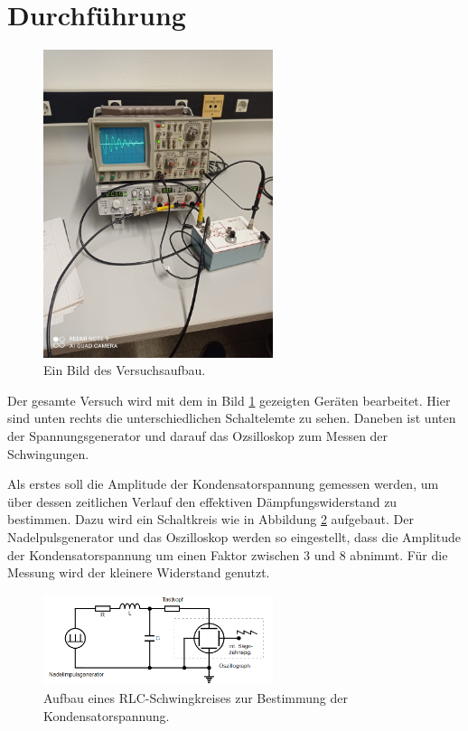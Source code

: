 \section{Durchführung}

\begin{figure}[H]
    \centering
    \includegraphics[width=0.6\textwidth]{images/Aufbau.jpeg}
    \caption{Ein Bild des Versuchsaufbau.}
    \label{img:aufb}
\end{figure}

\noindent Der gesamte Versuch wird mit dem in Bild \ref{img:aufb} gezeigten Geräten bearbeitet. Hier sind unten rechts die unterschiedlichen 
Schaltelemte zu sehen. Daneben ist unten der Spannungsgenerator und darauf das Ozsilloskop zum Messen der Schwingungen.

\noindent Als erstes soll die Amplitude der Kondensatorspannung gemessen werden, um über dessen zeitlichen Verlauf den effektiven Dämpfungswiderstand 
zu bestimmen. Dazu wird ein Schaltkreis wie in Abbildung \ref{img:5a} aufgebaut. Der Nadelpulsgenerator und das Oszilloskop werden so eingestellt, dass die 
Amplitude der Kondensatorspannung um einen Faktor zwischen 3 und 8 abnimmt. Für die Messung wird der kleinere Widerstand genutzt.

\begin{figure}[H]
    \centering
    \includegraphics[width=0.6\textwidth]{images/5a.PNG}
    \caption{Aufbau eines RLC-Schwingkreises zur Bestimmung der Kondensatorspannung\protect \cite{V354}.}
    \label{img:5a}
\end{figure}

